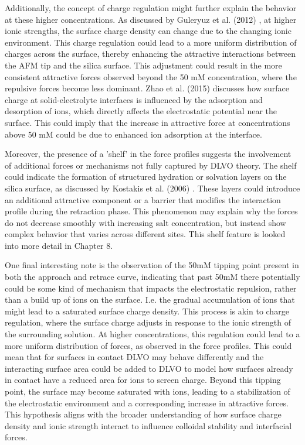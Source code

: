 Additionally, the concept of charge regulation might further explain the behavior at these higher concentrations. As discussed by Guleryuz et al. (2012) \cite{Guleryuz2012}, at higher ionic strengths, the surface charge density can change due to the changing ionic environment. This charge regulation could lead to a more uniform distribution of charges across the surface, thereby enhancing the attractive interactions between the AFM tip and the silica surface. This adjustment could result in the more consistent attractive forces observed beyond the 50 mM concentration, where the repulsive forces become less dominant. Zhao et al. (2015) \cite{zhao2015} discusses how surface charge at solid-electrolyte interfaces is influenced by the adsorption and desorption of ions, which directly affects the electrostatic potential near the surface. This could imply that the increase in attractive force at concentrations above 50 mM could be due to enhanced ion adsorption at the interface. \cite{Afekare2020}

Moreover, the presence of a 'shelf' in the force profiles suggests the involvement of additional forces or mechanisms not fully captured by DLVO theory. The shelf could indicate the formation of structured hydration or solvation layers on the silica surface, as discussed by Kostakis et al. (2006) \cite{Kostakis2006}. These layers could introduce an additional attractive component or a barrier that modifies the interaction profile during the retraction phase. This phenomenon may explain why the forces do not decrease smoothly with increasing salt concentration, but instead show complex behavior that varies across different sites. This shelf feature is looked into more detail in Chapter 8.

One final interesting note is the observation of the 50mM tipping point present in both the approach and retrace curve, indicating that past 50mM there potentially could be some kind of mechanism that impacts the electrostatic repulsion, rather than a build up of ions on the surface. I.e. the gradual accumulation of ions that might lead to a saturated surface charge density. This process is akin to charge regulation, where the surface charge adjusts in response to the ionic strength of the surrounding solution. At higher concentrations, this regulation could lead to a more uniform distribution of forces, as observed in the force profiles. This could mean that for surfaces in contact DLVO may behave differently and the interacting surface area could be added to DLVO to model how surfaces already in contact have a reduced area for ions to screen charge. Beyond this tipping point, the surface may become saturated with ions, leading to a stabilization of the electrostatic environment and a corresponding increase in attractive forces. This hypothesis aligns with the broader understanding of how surface charge density and ionic strength interact to influence colloidal stability and interfacial forces. \cite{israelachvili2011intermolecular}

